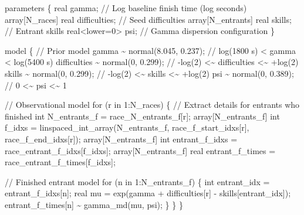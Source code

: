 \documentclass[
  letterpaper,
  DIV=11,
  numbers=noendperiod]{scrartcl}
\newenvironment{Shaded}{\begin{snugshade}}{\end{snugshade}}
\newcommand{\CommentTok}[1]{\textcolor[rgb]{0.37,0.37,0.37}{#1}}
\newcommand{\ControlFlowTok}[1]{\textcolor[rgb]{0.00,0.23,0.31}{#1}}
\newcommand{\DataTypeTok}[1]{\textcolor[rgb]{0.68,0.00,0.00}{#1}}
\newcommand{\DecValTok}[1]{\textcolor[rgb]{0.68,0.00,0.00}{#1}}
\newcommand{\FloatTok}[1]{\textcolor[rgb]{0.68,0.00,0.00}{#1}}
\newcommand{\KeywordTok}[1]{\textcolor[rgb]{0.00,0.23,0.31}{#1}}
\newcommand{\NormalTok}[1]{\textcolor[rgb]{0.00,0.23,0.31}{#1}}
\begin{document}
\begin{codelisting}
\begin{Shaded}
\begin{Highlighting}[]
\KeywordTok{parameters}\NormalTok{ \{}
  \DataTypeTok{real}\NormalTok{ gamma;                       }\CommentTok{// Log baseline finish time (log seconds)}
  \DataTypeTok{array}\NormalTok{[N\_races] }\DataTypeTok{real}\NormalTok{ difficulties; }\CommentTok{// Seed difficulties}
  \DataTypeTok{array}\NormalTok{[N\_entrants] }\DataTypeTok{real}\NormalTok{ skills;    }\CommentTok{// Entrant skills}
  \DataTypeTok{real}\NormalTok{\textless{}}\KeywordTok{lower}\NormalTok{=}\DecValTok{0}\NormalTok{\textgreater{} psi;                }\CommentTok{// Gamma dispersion configuration}
\NormalTok{\}}

\KeywordTok{model}\NormalTok{ \{}
  \CommentTok{// Prior model}
\NormalTok{  gamma \textasciitilde{} normal(}\FloatTok{8.045}\NormalTok{, }\FloatTok{0.237}\NormalTok{);    }\CommentTok{// log(1800 s) \textless{} gamma \textless{} log(5400 s)}
\NormalTok{  difficulties \textasciitilde{} normal(}\DecValTok{0}\NormalTok{, }\FloatTok{0.299}\NormalTok{); }\CommentTok{// {-}log(2) \textless{}\textasciitilde{} difficulties \textless{}\textasciitilde{} +log(2)}
\NormalTok{  skills \textasciitilde{} normal(}\DecValTok{0}\NormalTok{, }\FloatTok{0.299}\NormalTok{);       }\CommentTok{// {-}log(2) \textless{}\textasciitilde{}    skills    \textless{}\textasciitilde{} +log(2)}
\NormalTok{  psi \textasciitilde{} normal(}\DecValTok{0}\NormalTok{, }\FloatTok{0.389}\NormalTok{);          }\CommentTok{// 0 \textless{}\textasciitilde{} psi \textless{}\textasciitilde{} 1}

  \CommentTok{// Observational model}
  \ControlFlowTok{for}\NormalTok{ (r }\ControlFlowTok{in} \DecValTok{1}\NormalTok{:N\_races) \{}
    \CommentTok{// Extract details for entrants who finished}
    \DataTypeTok{int}\NormalTok{ N\_entrants\_f = race\_N\_entrants\_f[r];}
    \DataTypeTok{array}\NormalTok{[N\_entrants\_f] }\DataTypeTok{int}\NormalTok{ f\_idxs = linspaced\_int\_array(N\_entrants\_f,}
\NormalTok{                                                         race\_f\_start\_idxs[r],}
\NormalTok{                                                         race\_f\_end\_idxs[r]);}
    \DataTypeTok{array}\NormalTok{[N\_entrants\_f] }\DataTypeTok{int}\NormalTok{ entrant\_f\_idxs = race\_entrant\_f\_idxs[f\_idxs];}
    \DataTypeTok{array}\NormalTok{[N\_entrants\_f] }\DataTypeTok{real}\NormalTok{ entrant\_f\_times = race\_entrant\_f\_times[f\_idxs];}

    \CommentTok{// Finished entrant model}
    \ControlFlowTok{for}\NormalTok{ (n }\ControlFlowTok{in} \DecValTok{1}\NormalTok{:N\_entrants\_f) \{}
      \DataTypeTok{int}\NormalTok{ entrant\_idx = entrant\_f\_idxs[n];}
      \DataTypeTok{real}\NormalTok{ mu = exp(gamma + difficulties[r] {-} skills[entrant\_idx]);}
\NormalTok{      entrant\_f\_times[n] \textasciitilde{} gamma\_md(mu, psi);}
\NormalTok{    \}}
\NormalTok{  \}}
\NormalTok{\}}


\end{Highlighting}
\end{Shaded}
\end{codelisting}
\end{document}
